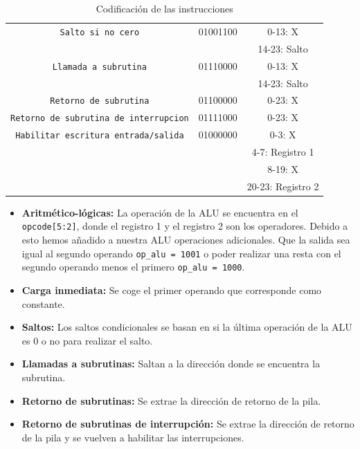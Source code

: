 \documentclass[11pt]{report}
\begin{document}
\begin{table}[H]
\begin{tabular}{|c|c|c|}
    \texttt{Salto si no cero}                     & 01001100        & 0-13: X                    \\
                                                  &                 & 14-23: Salto               \\ \hline
    \texttt{Llamada a subrutina}                  & 01110000        & 0-13: X                    \\
                                                  &                 & 14-23: Salto               \\ \hline
    \texttt{Retorno de subrutina}                 & 01100000        & 0-23: X                    \\ \hline
    \texttt{Retorno de subrutina de interrupcion} & 01111000        & 0-23: X                    \\ \hline
    \texttt{Habilitar escritura entrada/salida}   & 01000000        & 0-3: X                     \\
                                                  &                 & 4-7: Registro 1            \\
                                                  &                 & 8-19: X                    \\
                                                  &                 & 20-23: Registro 2          \\ \hline
  \end{tabular}
  \caption{Codificación de las instrucciones}
  \label{tab:codificación de las instrucciones}
\end{table}

\begin{itemize}
  \item \textbf{Aritmético-lógicas:} La operación de la ALU se encuentra en el \texttt{opcode[5:2]}, donde el registro 1 y el registro 2 son los operadores. Debido a esto hemos añadido a nuestra ALU operaciones adicionales. Que la salida sea igual al segundo operando \texttt{op\_alu = 1001} o poder realizar una resta con el segundo operando menos el primero \texttt{op\_alu = 1000}.
  \item \textbf{Carga inmediata:} Se coge el primer operando que corresponde como constante.
  \item \textbf{Saltos:} Los saltos condicionales se basan en si la última operación de la ALU es 0 o no para realizar el salto.
  \item \textbf{Llamadas a subrutinas:} Saltan a la dirección donde se encuentra la subrutina.
  \item \textbf{Retorno de subrutinas:} Se extrae la dirección de retorno de la pila.
  \item \textbf{Retorno de subrutinas de interrupción:} Se extrae la dirección de retorno de la pila y se vuelven a habilitar las interrupciones.
\end{itemize}
\end{document}
